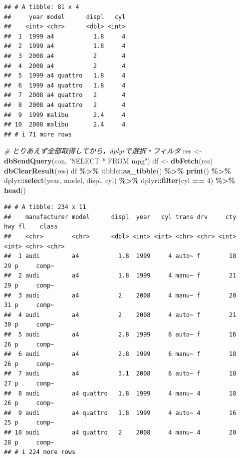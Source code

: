 \documentclass[
]{article}
\newenvironment{Shaded}{\begin{snugshade}}{\end{snugshade}}
\newcommand{\CommentTok}[1]{\textcolor[rgb]{0.56,0.35,0.01}{\textit{#1}}}
\newcommand{\DecValTok}[1]{\textcolor[rgb]{0.00,0.00,0.81}{#1}}
\newcommand{\FunctionTok}[1]{\textcolor[rgb]{0.13,0.29,0.53}{\textbf{#1}}}
\newcommand{\NormalTok}[1]{#1}
\newcommand{\OtherTok}[1]{\textcolor[rgb]{0.56,0.35,0.01}{#1}}
\newcommand{\SpecialCharTok}[1]{\textcolor[rgb]{0.81,0.36,0.00}{\textbf{#1}}}
\newcommand{\StringTok}[1]{\textcolor[rgb]{0.31,0.60,0.02}{#1}}
\begin{document}
\begin{verbatim}
## # A tibble: 81 x 4
##     year model      displ   cyl
##    <int> <chr>      <dbl> <int>
##  1  1999 a4           1.8     4
##  2  1999 a4           1.8     4
##  3  2008 a4           2       4
##  4  2008 a4           2       4
##  5  1999 a4 quattro   1.8     4
##  6  1999 a4 quattro   1.8     4
##  7  2008 a4 quattro   2       4
##  8  2008 a4 quattro   2       4
##  9  1999 malibu       2.4     4
## 10  2008 malibu       2.4     4
## # i 71 more rows
\end{verbatim}

\begin{Shaded}
\begin{Highlighting}[]
  \CommentTok{\# とりあえず全部取得してから，dplyrで選択・フィルタ}
\NormalTok{res }\OtherTok{\textless{}{-}} \FunctionTok{dbSendQuery}\NormalTok{(con, }\StringTok{"SELECT * FROM mpg"}\NormalTok{)}
\NormalTok{df }\OtherTok{\textless{}{-}} \FunctionTok{dbFetch}\NormalTok{(res)}
\FunctionTok{dbClearResult}\NormalTok{(res)}
\NormalTok{df }\SpecialCharTok{\%\textgreater{}\%}
\NormalTok{  tibble}\SpecialCharTok{::}\FunctionTok{as\_tibble}\NormalTok{() }\SpecialCharTok{\%\textgreater{}\%}
  \FunctionTok{print}\NormalTok{() }\SpecialCharTok{\%\textgreater{}\%}
\NormalTok{  dplyr}\SpecialCharTok{::}\FunctionTok{select}\NormalTok{(year, model, displ, cyl) }\SpecialCharTok{\%\textgreater{}\%}
\NormalTok{  dplyr}\SpecialCharTok{::}\FunctionTok{filter}\NormalTok{(cyl }\SpecialCharTok{==} \DecValTok{4}\NormalTok{) }\SpecialCharTok{\%\textgreater{}\%}
  \FunctionTok{head}\NormalTok{()}
\end{Highlighting}
\end{Shaded}

\begin{verbatim}
## # A tibble: 234 x 11
##    manufacturer model      displ  year   cyl trans drv     cty   hwy fl    class
##    <chr>        <chr>      <dbl> <int> <int> <chr> <chr> <int> <int> <chr> <chr>
##  1 audi         a4           1.8  1999     4 auto~ f        18    29 p     comp~
##  2 audi         a4           1.8  1999     4 manu~ f        21    29 p     comp~
##  3 audi         a4           2    2008     4 manu~ f        20    31 p     comp~
##  4 audi         a4           2    2008     4 auto~ f        21    30 p     comp~
##  5 audi         a4           2.8  1999     6 auto~ f        16    26 p     comp~
##  6 audi         a4           2.8  1999     6 manu~ f        18    26 p     comp~
##  7 audi         a4           3.1  2008     6 auto~ f        18    27 p     comp~
##  8 audi         a4 quattro   1.8  1999     4 manu~ 4        18    26 p     comp~
##  9 audi         a4 quattro   1.8  1999     4 auto~ 4        16    25 p     comp~
## 10 audi         a4 quattro   2    2008     4 manu~ 4        20    28 p     comp~
## # i 224 more rows
\end{verbatim}
\end{document}
